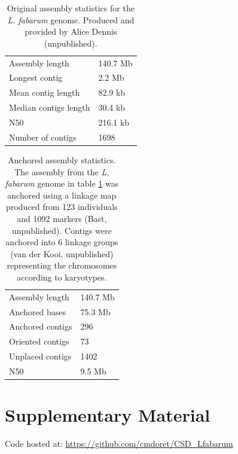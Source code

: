 \documentclass[11pt,a4paper]{report}
\begin{document}
\begin{table}[!ht]
\begin{center}
\begin{tabular}{ l l} 
 \hline
Assembly length & 140.7 Mb\\ 
Longest contig & 2.2 Mb\\ 
Mean contig length & 82.9 kb\\ 
Median contigs length & 30.4 kb\\ 
N50 & 216.1 kb\\
Number of contigs & 1698\\ 
 \hline
\end{tabular}
\end{center}
\caption{Original assembly statistics for the \textit{L. fabarum} genome. Produced and provided by Alice Dennis (unpublished).}
\label{genome}
\end{table}

\begin{table}[!ht]
\begin{center}
\begin{tabular}{ l l} 
 \hline
Assembly length & 140.7 Mb\\
Anchored bases & 75.3 Mb\\
Anchored contigs & 296\\
Oriented contigs & 73\\
Unplaced contigs & 1402\\
N50 & 9.5 Mb\\
 \hline
\end{tabular}
\end{center}
\caption{Anchored assembly statistics. The assembly from the \textit{L. fabarum} genome in table \ref{genome} was anchored using a linkage map produced from 123 individuals and 1092 markers (Bast, unpublished). Contigs were anchored into 6 linkage groups  (van der Kooi, unpublished) representing the chromosomes according to karyotypes.}
\label{anchored}
\end{table}

\section{Supplementary Material}

Code  hosted at: \url{https://github.com/cmdoret/CSD_Lfabarum}\\


\fancyhead[L]{\slshape }

\end{document}
